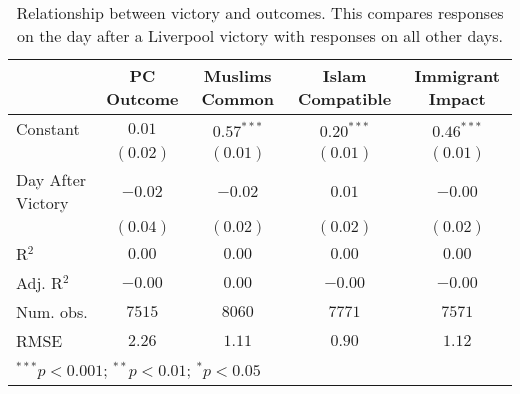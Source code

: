 
\begin{table}[H]
\begin{center}
\begin{footnotesize}
\begin{tabular}{l c c c c}
\hline
 & PC Outcome & Muslims Common & Islam Compatible & Immigrant Impact \\
\hline
Constant          & $0.01$   & $0.57^{***}$ & $0.20^{***}$ & $0.46^{***}$ \\
                  & $(0.02)$ & $(0.01)$     & $(0.01)$     & $(0.01)$     \\
Day After
Victory & $-0.02$  & $-0.02$      & $0.01$       & $-0.00$      \\
                  & $(0.04)$ & $(0.02)$     & $(0.02)$     & $(0.02)$     \\
\hline
R$^2$             & $0.00$   & $0.00$       & $0.00$       & $0.00$       \\
Adj. R$^2$        & $-0.00$  & $0.00$       & $-0.00$      & $-0.00$      \\
Num. obs.         & $7515$   & $8060$       & $7771$       & $7571$       \\
RMSE              & $2.26$   & $1.11$       & $0.90$       & $1.12$       \\
\hline
\multicolumn{5}{l}{\tiny{$^{***}p<0.001$; $^{**}p<0.01$; $^{*}p<0.05$}}
\end{tabular}
\end{footnotesize}
\caption{Relationship between victory and outcomes. This compares responses on the day after a Liverpool victory 
       with responses on all other days.}
\label{tab:fb_victory2}
\end{center}
\end{table}
